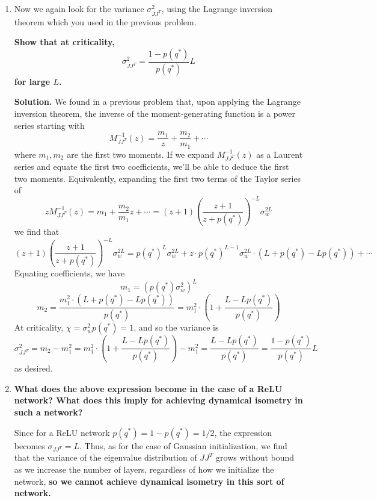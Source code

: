 \documentclass[a4paper]{article}
\begin{document}
\begin{enumerate}[label=(\alph*)]
    \item Now we again look for the variance $\sigma_{JJ^T}^2$, using the Lagrange inversion theorem which you used in the previous problem.  
    
    \textbf{Show that at criticality, 
    \begin{equation}
        \sigma_{JJ^T}^2 = \frac{1-p(q^*)}{p(q^*)}L
    \end{equation}
    for large $L$.}
    \begin{tcolorbox}
     \textbf{Solution.} We found in a previous problem that, upon applying the Lagrange inversion theorem, the inverse of the moment-generating function is a power series starting with
    $$ M_{JJ^T}^{-1}(z) = \frac{m_1}{z} + \frac{m_2}{m_1} + \cdots $$
    where $m_1, m_2$ are the first two moments. If we expand $ M_{JJ^T}^{-1}(z) $ as a Laurent series and equate the first two coefficients, we'll be able to deduce the first two moments. Equivalently, expanding the first two terms of the Taylor series of
        $$ z M_{JJ^T}^{-1}(z) = m_1 + \frac{m_2}{m_1} z + \cdots = (z + 1) \left( \frac{z + 1}{z + p(q^*)} \right)^{-L} \sigma_w^{2L} $$
    we find that
        $$ (z + 1) \left( \frac{z + 1}{z + p(q^*)} \right)^{-L} \sigma_w^{2L} = p(q^*)^L \sigma_w^{2L} + z \cdot p(q^*)^{L - 1} \sigma_w^{2L} \cdot \left( L + p(q^*) - L p(q^*) \right) + \cdots $$
    Equating coefficients, we have
        $$ m_1 = (p(q^*) \sigma_w^2)^L $$
        $$ m_2 = \frac{m_1^2 \cdot (L + p(q^*) - L p(q^*))}{p(q^*)} = m_1^2 \cdot \left( 1 + \frac{L - L p(q^*)}{p(q^*)} \right) $$
    At criticality, $\chi = \sigma_w^2 p(q^*) = 1 $, and so the variance is
    $$ \sigma_{JJ^T}^2 = m_2 - m_1^2 = m_1^2 \cdot \left( 1 + \frac{L - L p(q^*)}{p(q^*)} \right) - m_1^2 = \frac{L - L p(q^*)}{p(q^*)} = \frac{1 - p(q^*)}{p(q^*)} L $$
    as desired.
    \end{tcolorbox}
    
    \item \textbf{What does the above expression become in the case of a ReLU network?  What does this imply for achieving dynamical isometry in such a network?}
    \begin{tcolorbox}
    Since for a ReLU network $p(q^*) = 1 - p(q^*) = 1/2$, the expression becomes $\sigma_{JJ^T} = L$.  Thus, as for the case of Gaussian initialization, we find that the variance of the eigenvalue distribution of $JJ^T$ grows without bound as we increase the number of layers, regardless of how we initialize the network, \textbf{so we cannot achieve dynamical isometry in this sort of network.}
    

\end{tcolorbox}
\end{enumerate}
\end{document}
